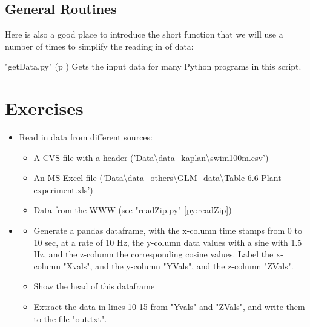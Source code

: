 \subsection{General Routines}
Here is also a good place to introduce the short function that we will use a number of times to simplify the reading in of data:

\PyImg "getData.py" (p \pageref{py:getData}) Gets the input data for many Python programs in this script.

\section{Exercises}

\begin{itemize}
  \item Read in data from different sources:
  \begin{itemize}
    \item A CVS-file with a header ('Data\textbackslash data\_kaplan\textbackslash swim100m.csv')
    \item An MS-Excel file ('Data\textbackslash data\_others\textbackslash GLM\_data\textbackslash Table 6.6 Plant experiment.xls')
    \item Data from the WWW (see "readZip.py" \ref{py:readZip})
  \end{itemize}
  \item
  \begin{itemize}
      \item Generate a pandas dataframe, with the x-column time stamps from 0 to 10 sec, at a rate of 10 Hz, the y-column data values with a sine with 1.5 Hz, and the z-column the corresponding cosine values. Label the x-column "Xvals", and the y-column "YVals", and the z-column "ZVals".
      \item Show the head of this dataframe
      \item Extract the data in lines 10-15 from "Yvals" and "ZVals", and write them to the file "out.txt".
  \end{itemize}
\end{itemize}
